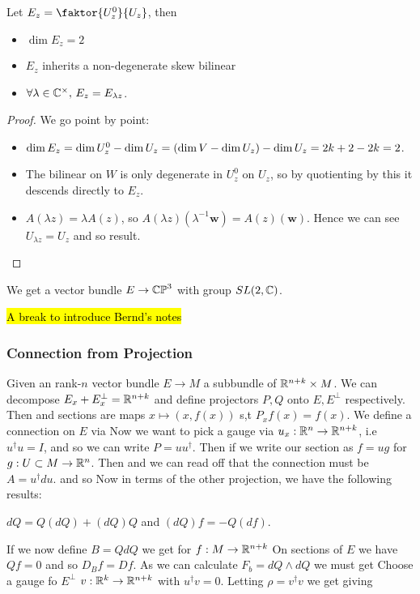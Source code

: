 \documentclass{article}
\begin{document}
\begin{lemma}
	Let $E_z = \faktor{U_z^0}{U_z}$, then 
	\begin{itemize}
		\item $\dim E_z = 2$
		\item $E_z$ inherits a non-degenerate skew bilinear
		\item $\forall \lambda \in \mathbb{C}^\times, \, E_z = E_{\lambda z}$. 
	\end{itemize}
\end{lemma}
\begin{proof}
	We go point by point:
	\begin{itemize}
		\item $\dim E_z = \dim U_z^0 - \dim U_z = \left( \dim V - \dim U_z \right) - \dim U_z = 2k+2 - 2k = 2$.
		\item The bilinear on $W$ is only degenerate in $U_z^0$ on $U_z$, so by quotienting by this it descends directly to $E_z$. 
		\item $A(\lambda z) = \lambda A(z)$, so $A(\lambda z) (\lambda^{-1} \bm{w}) = A(z)(\bm{w})$. Hence we can see $U_{\lambda z} = U_z$ and so result.  
	\end{itemize}
\end{proof}

\begin{corollary}
	We get a vector bundle $E\to \mathbb{CP}^3$ with group $SL(2,\mathbb{C})$.
\end{corollary}


\hl{A break to introduce Bernd's notes}

\subsubsection{Connection from Projection}
Given an rank-$n$ vector bundle $E \to M$ a subbundle of $\mathbb{R}^{n+k} \times M$. We can decompose $E_x + E_x^\perp = \mathbb{R}^{n+k}$ and define projectors $P,Q$ onto $E,E^\perp$ respectively. Then 
and sections are maps $x \mapsto (x,f(x))$ s,t $P_xf(x) = f(x)$. We define a connection on $E$ via 
Now we want to pick a gauge via $u_x: \mathbb{R}^n \to \mathbb{R}^{n+k}$, i.e $u^\dagger u = I$, and so we can write $P = uu^\dagger$. Then if we write our section as $f=ug$ for $g:U \subset M \to \mathbb{R}^n$. Then
and we can read off that the connection must be $A = u^\dagger du$. and so 
Now in terms of the other projection, we have the following results:
\begin{lemma}
	$dQ = Q(dQ) + (dQ)Q$ and $(dQ)f = -Q(df)$. 
\end{lemma} 
If we now define $B = QdQ$ we get for $f: M \to \mathbb{R}^{n+k}$ 
On sections of $E$ we have $Qf=0$ and so $D_B f = Df$. As we can calculate $F_b = dQ \wedge dQ$ we must get 
Choose a gauge fo $E^\perp$ $v:\mathbb{R}^k \to \mathbb{R}^{n+k}$ with $u^\dagger v= 0$. Letting $\rho = v^\dagger v$ we get 
giving 
\end{document}
